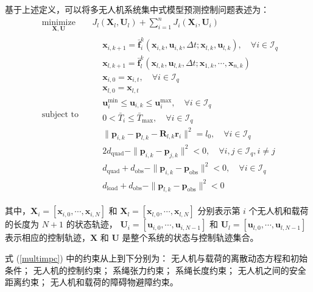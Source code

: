 \documentclass[lang=chs, degree=master, blindreview=true, winfonts=true]{yanputhesis}
\begin{document}
基于上述定义，可以将多无人机系统集中式模型预测控制问题表述为：
\begin{equation}
	\begin{aligned} 
	&\operatorname*{minimize}_{\bm{X}, \bm{U}}& & J_l(\bm{X}_l, \bm{U}_l) + \sum_{i=1}^n J_i(\bm{X}_i, \bm{U}_i)  \\
	&\text{subject to}& & \begin{aligned}
	& \bm{x}_{i,k+1} = \bar{\bm{f}}_i^k(\bm{x}_{i,k}, \bm{u}_{i,k}, \Delta t; \bm{x}_{l,k}, \bm{u}_{l,k}), \quad \forall i \in \mathcal{I}_q \\
	& \bm{x}_{l,k+1} = \bar{\bm{f}}_l^k(\bm{x}_{l,k}, \bm{u}_{l,k}, \Delta t; \bm{x}_{1,k}, \cdots, \bm{x}_{n,k}) \\
	& \bm{x}_{i,0} = \bm{x}_{i,t}, \quad \forall i \in \mathcal{I}_q \\
	& \bm{x}_{l,0} = \bm{x}_{l,t} \\
	& \bm{u}_{i}^{\min} \leq \bm{u}_{i,k} \leq \bm{u}_{i}^{\max}, \quad \forall i \in \mathcal{I}_q \\
	& 0 < \bar{T}_i \leq \bar{T}_{\max}, \quad \forall i \in \mathcal{I}_q \\
	& \|\bm{p}_{i,k} - \bm{p}_{l,k} - \bm{R}_{l,k} \bm{r}_i\|^2 = l_0, \quad \forall i \in \mathcal{I}_q \\
	& 2d_\text{quad} - \|\bm{p}_{i,k} - \bm{p}_{j,k}\|^2 < 0, \quad \forall i, j \in \mathcal{I}_q, i \neq j \\
	& d_\text{quad} + d_\text{obs} - \|\bm{p}_{i,k} - \bm{p}_\text{obs}\|^2 < 0, \quad \forall i \in \mathcal{I}_q \\
	& d_\text{load} + d_\text{obs} - \|\bm{p}_{l,k} - \bm{p}_\text{obs}\|^2 < 0        
	\end{aligned}	
\end{aligned}
\label{multimpc}
\end{equation}

其中，\( \bm X_i = \left[ \bm x_{i,0}, \cdots, \bm x_{i,N} \right] \) 和 \( \bm X_l = \left[ \bm x_{l,0}, \cdots, \bm x_{l,N} \right] \) 分别表示第 \( i \) 个无人机和载荷的长度为 \( N+1 \) 的状态轨迹，
\( \bm U_i = \left[ \bm u_{i,0}, \cdots, \bm u_{i,{N-1}} \right] \) 和 \( \bm U_l = \left[ \bm u_{l,0}, \cdots, \bm u_{l,{N-1}} \right] \) 表示相应的控制轨迹，\( \bm X \) 和 \( \bm U \) 是整个系统的状态与控制轨迹集合。

式 (\ref{multimpc}) 中的约束从上到下分别为：
无人机与载荷的离散动态方程和初始条件；
无人机的控制约束；
系绳张力约束；
系绳长度约束；
无人机之间的安全距离约束；
无人机和载荷的障碍物避障约束。
\end{document}
